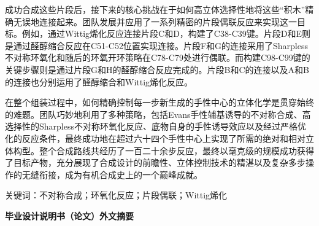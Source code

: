  成功合成这些片段后，接下来的核心挑战在于如何高立体选择性地将这些“积木”精确无误地连接起来。团队发展并应用了一系列精密的片段偶联反应来实现这一目标。例如，通过Wittig烯化反应连接片段C和D，构建了C38-C39键。片段D和E则是通过醛醇缩合反应在C51-C52位置实现连接。片段F和G的连接采用了Sharpless不对称环氧化和随后的环氧开环策略在C78-C79处进行偶联。而构建C98-C99键的关键步骤则是通过片段G和H的醛醇缩合反应完成的。片段B和C的连接以及A和B的连接也分别运用了醛醇缩合和Wittig烯化反应。

在整个组装过程中，如何精确控制每一步新生成的手性中心的立体化学是贯穿始终的难题。团队巧妙地利用了多种策略，包括Evans手性辅基诱导的不对称合成、高选择性的Sharpless不对称环氧化反应、底物自身的手性诱导效应以及经过严格优化的反应条件，最终成功地在超过六十四个手性中心上实现了所需的绝对和相对立体构型。整个合成路线共经历了一百二十余步反应，最终以毫克级的规模成功获得了目标产物，充分展现了合成设计的前瞻性、立体控制技术的精湛以及复杂多步操作的无缝衔接，成为有机合成史上的一个巅峰成就。

\vspace{0.5cm}
\noindent
{}\heiti 关键词：\songti 不对称合成；环氧化反应；片段偶联；Wittig烯化


\newpage %
\thispagestyle{empty} %
\begin{center}
    \vspace*{-1.6cm} %
    {\songti \textbf{毕\hspace{0.3em}业\hspace{0.3em}设\hspace{0.3em}计\hspace{0.3em}说\hspace{0.3em}明\hspace{0.3em}书\hspace{0.3em}（论文）\hspace{0.3em}外\hspace{0.3em}文\hspace{0.3em}摘\hspace{0.3em}要}}\\
\end{center}

\setlength{\parindent}{2em}   %
\setlength{\parskip}{0pt plus 1.0pt}   %
\songti             %


